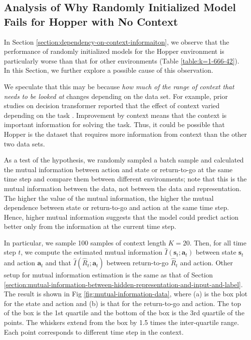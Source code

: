 \documentclass{article}
\begin{document}
\subsection{Analysis of Why Randomly Initialized Model Fails for Hopper with No Context}

In Section \ref{section:dependency-on-context-informaiton}, we observe that the performance of randomly initialized models for the Hopper environment is particularly worse than that for other environments (Table \ref{table:k=1-666-42}). In this Section, we further explore a possible cause of this observation.

We speculate that this may be because \textit{how much of the range of context that needs to be looked at} changes depending on the data set. For example, prior studies on decision transformer reported that the effect of context varied depending on the task \cite{chen2021decision}. Improvement by context means that the context is important information for solving the task. Thus, it could be possible that Hopper is the dataset that requires more information from context than the other two data sets.

As a test of the hypothesis, we randomly sampled a batch sample and calculated the mutual information between action and state or return-to-go at the same time step and compare them between different environments; note that this is the mutual information between the data, not between the data and representation. The higher the value of the mutual information, the higher the mutual dependence between state or return-to-go and action at the same time step. Hence, higher mutual information suggests that the model could predict action better only from the information at the current time step. 

In particular, we sample 100 samples of context length $K = 20$. Then, for all time step $t$, we compute the estimated mutual information $\hat{I}(\bm{s}_t; \bm{a}_t)$ between state $\bm{s}_t$ and action $\bm{a}_t$ and that $\hat{I}(\hat{R}_t; \bm{a}_t)$ between return-to-go $\hat{R}_t$ and action. Other setup for mutual information estimation is the same as that of Section \ref{section:mutual-information-between-hidden-representation-and-input-and-label}. The result is shown in Fig \ref{fig:mutual-information-data}, where (a) is the box plot for the state and action and (b) is that for the return-to-go and action. The top of the box is the 1st quartile and the bottom of the box is the 3rd quartile of the points. The whiskers extend from the box by 1.5 times the inter-quartile range. Each point corresponds to different time step in the context. 
\end{document}
